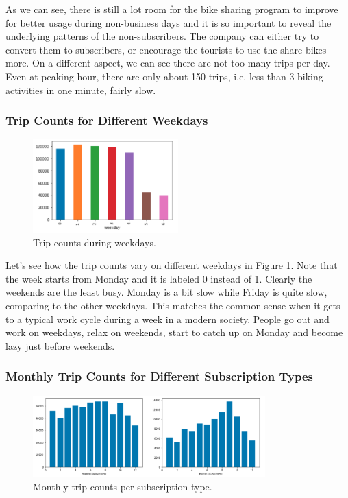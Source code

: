 \documentclass[a4paper]{article}
\begin{document}
			As we can see, there is still a lot room for the bike sharing program to improve for better usage during non-business days and it is so important to reveal the underlying patterns of the non-subscribers. The company can either try to convert them to subscribers, or encourage the tourists to use the share-bikes more. On a different aspect, we can see there are not too many trips per day. Even at peaking hour, there are only about 150 trips, i.e. less than 3 biking activities in one minute, fairly slow.
			
			\subsubsection{Trip Counts for Different Weekdays}
			
			\begin{figure}
				\centering
				\includegraphics[width=0.5\textwidth]{WeekdayTrips.png}
				\caption{\label{fig:weekday_trips}Trip counts during weekdays.}
			\end{figure}	
			
			Let's see how the trip counts vary on different weekdays in Figure \ref{fig:weekday_trips}. Note that the week starts from Monday and it is labeled 0 instead of 1. Clearly the weekends are the least busy. Monday is a bit slow while Friday is quite slow, comparing to the other weekdays. This matches the common sense when it gets to a typical work cycle during a week in a modern society. People go out and work on weekdays, relax on weekends, start to catch up on Monday and become lazy just before weekends.
			
			\subsubsection{Monthly Trip Counts for Different Subscription Types}
			
			\begin{figure}
				\centering
				\includegraphics[width=0.8\textwidth]{MonthlyTripsSubs.png}
				\caption{\label{fig:monthly_trips}Monthly trip counts per subscription type.}
			\end{figure}	
			
\end{document}
